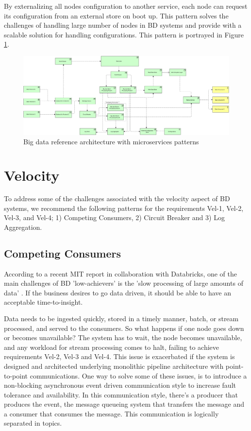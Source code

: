 \documentclass[a4paper,11pt,article,oneside]{memoir}
\begin{document}
By externalizing all nodes configuration to another service, each node can request its configuration from an external store on boot up. This pattern solves the challenges of handling large number of nodes in BD systems and provide with a scalable solution for handling configurations. This pattern is portrayed in Figure \ref{fig:RA}.

\begin{figure}[h]
    \centering 
    \includegraphics[width=16.5cm]{Media/All together.jpg}
    \caption{Big data reference architecture with microservices patterns}
    \label{fig:RA}
\end{figure}

\section{Velocity}

To address some of the challenges associated with the velocity aspect of BD systems, we recommend the following patterns for the requirements Vel-1, Vel-2, Vel-3, and Vel-4; 1) Competing Consumers, 2) Circuit Breaker and 3) Log Aggregation.

\subsection{Competing Consumers}

According to a recent MIT report in collaboration with Databricks, one of the main challenges of BD 'low-achievers' is the 'slow processing of large amounts of data' \citep{DataBricksSurvey}. If the business desires to go data driven, it should be able to have an acceptable time-to-insight. 


Data needs to be ingested quickly, stored in a timely manner, batch, or stream processed, and served to the consumers. So what happens if one node goes down or becomes unavailable? The system has to wait, the node becomes unavailable, and any workload for stream processing comes to halt, failing to achieve requirements Vel-2, Vel-3 and Vel-4. This issue is exacerbated if the system is designed and architected underlying monolithic pipeline architecture with point-to-point communications. One way to solve some of these issues, is to introduce a non-blocking asynchronous event driven communication style to increase fault tolerance and availability. In this communication style, there's a producer that produces the event, the message queueing system that transfers the message and a consumer that consumes the message. This communication is logically separated in topics. 
\end{document}
